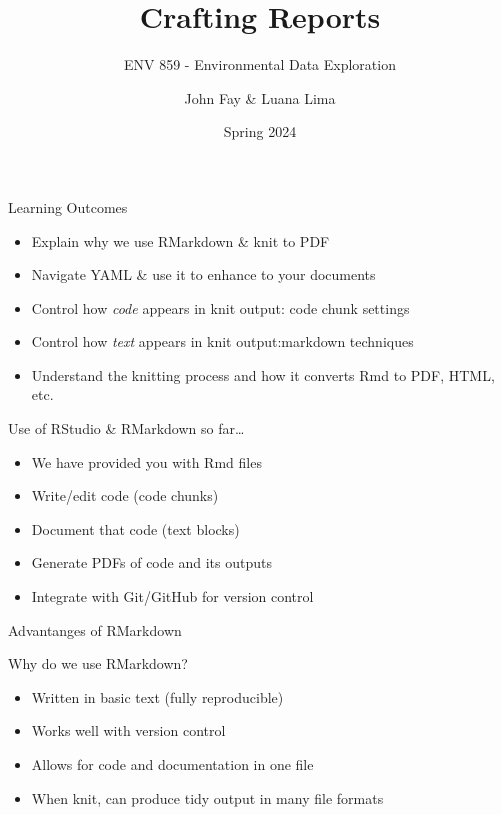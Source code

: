 \documentclass[
  ignorenonframetext,
]{beamer}
\title{Crafting Reports}
\subtitle{ENV 859 - Environmental Data Exploration}
\author{John Fay \& Luana Lima}
\date{Spring 2024}
\providecommand{\tightlist}{%
  \setlength{\itemsep}{0pt}\setlength{\parskip}{0pt}}
\begin{document}
\frame{\titlepage}

\begin{frame}{Learning Outcomes}
\protect\hypertarget{learning-outcomes}{}
\begin{itemize}
\tightlist
\item
  Explain why we use RMarkdown \& knit to PDF
\item
  Navigate YAML \& use it to enhance to your documents
\item
  Control how \emph{code} appears in knit output: code chunk settings
\item
  Control how \emph{text} appears in knit output:markdown techniques
\item
  Understand the knitting process and how it converts Rmd to PDF, HTML,
  etc.
\end{itemize}
\end{frame}

\begin{frame}{Use of RStudio \& RMarkdown so far\ldots{}}
\protect\hypertarget{use-of-rstudio-rmarkdown-so-far}{}
\begin{itemize}
\tightlist
\item
  We have provided you with Rmd files
\item
  Write/edit code (code chunks)
\item
  Document that code (text blocks)
\item
  Generate PDFs of code and its outputs
\item
  Integrate with Git/GitHub for version control
\end{itemize}
\end{frame}

\begin{frame}{Advantanges of RMarkdown}
\protect\hypertarget{advantanges-of-rmarkdown}{}
\begin{block}{Why do we use RMarkdown?}
\protect\hypertarget{why-do-we-use-rmarkdown}{}
\begin{itemize}
\tightlist
\item
  Written in basic text (fully reproducible)
\item
  Works well with version control
\item
  Allows for code and documentation in one file
\item
  When knit, can produce tidy output in many file formats
\end{itemize}
\end{block}
\end{frame}
\end{document}

